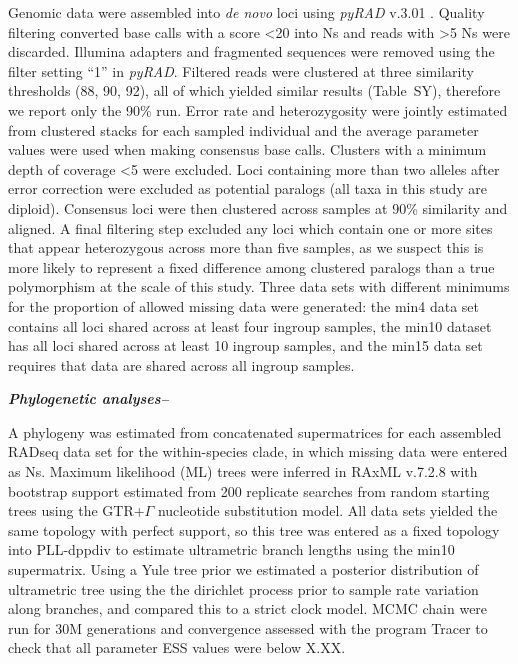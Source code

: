 \documentclass[12pt,letterpaper]{article}
\renewcommand{\subsection}[1]{%
\bigskip
{\noindent \normalfont \bf \emph{#1}}
}
\begin{document}
Genomic data were assembled into \emph{de novo} loci using \emph{pyRAD} v.3.01 \citep{eaton_pyrad:_2014}. Quality filtering converted base calls with a score \textless20 into Ns and reads with \textgreater5 Ns were discarded. Illumina adapters and fragmented sequences were removed using the filter setting ``1'' in \emph{pyRAD}. Filtered reads were clustered at three similarity thresholds (88, 90, 92), all of which yielded similar results (Table~SY), therefore we report only the 90\% run. Error rate and heterozygosity were jointly estimated from clustered stacks for each sampled individual and the average parameter values were used when making consensus base calls. Clusters with a minimum depth of coverage \textless5 were excluded. Loci containing more than two alleles after error correction were excluded as potential paralogs (all taxa in this study are diploid). Consensus loci were then clustered across samples at 90\% similarity and aligned. A final filtering step excluded any loci which contain one or more sites that appear heterozygous across more than five samples, as we suspect this is more likely to represent a fixed difference among clustered paralogs than a true polymorphism at the scale of this study. Three data sets with different minimums for the proportion of allowed missing data were generated: the min4 data set contains all loci shared across at least four ingroup samples, the min10 dataset has all loci shared across at least 10 ingroup samples, and the min15 data set requires that data are shared across all ingroup samples. 

\subsection{Phylogenetic analyses--}
A phylogeny was estimated from concatenated supermatrices for each assembled RADseq data set for the within-species clade, in which missing data were entered as Ns. Maximum likelihood (ML) trees were inferred in RAxML v.7.2.8 \citep{stamatakis_raxml_2014} with bootstrap support estimated from 200 replicate searches from random starting trees using the GTR+$\Gamma$ nucleotide substitution model. All data sets yielded the same topology with perfect support, so this tree was entered as a fixed topology into PLL-dppdiv \citep{heath_x_x} to estimate ultrametric branch lengths using the min10 supermatrix. Using a Yule tree prior we estimated a posterior distribution of ultrametric tree using the the dirichlet process prior to sample rate variation along branches, and compared this to a strict clock model. MCMC chain were run for 30M generations and convergence assessed with the program Tracer \citep{} to check that all parameter ESS values were below X.XX. 
\end{document}
